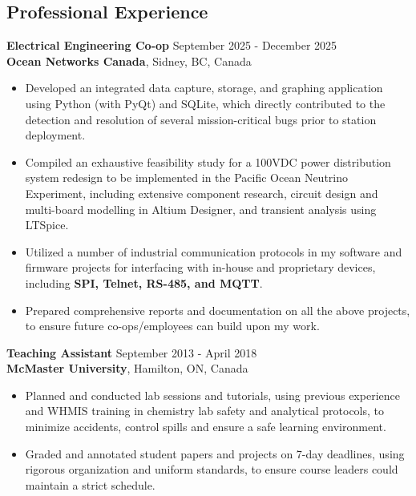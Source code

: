 \documentclass[line,margin]{res}
\begin{document}
\begin{resume}
\section{Professional Experience}
    \textbf{Electrical Engineering Co-op} \hfill September 2025 - December 2025 \\
    \textbf{Ocean Networks Canada}, Sidney, BC, Canada
    \begin{itemize}  \itemsep -2pt
        \item Developed an integrated data capture, storage, and graphing application using Python (with PyQt) and SQLite, which directly contributed to the detection and resolution of several mission-critical bugs prior to station deployment.
        \item Compiled an exhaustive feasibility study for a 100VDC power distribution system redesign to be implemented in the Pacific Ocean Neutrino Experiment, including extensive component research, circuit design and multi-board modelling in Altium Designer, and transient analysis using LTSpice.
        \item Utilized a number of industrial communication protocols in my software and firmware projects for interfacing with in-house and proprietary devices, including \textbf{SPI, Telnet, RS-485, and MQTT}.
        \item Prepared comprehensive reports and documentation on all the above projects, to ensure future co-ops/employees can build upon my work.
    \end{itemize} 
    \textbf{Teaching Assistant} \hfill September 2013 - April 2018 \\
    \textbf{McMaster University}, Hamilton, ON, Canada
    \begin{itemize}  \itemsep -2pt
        \item Planned and conducted lab sessions and tutorials, using previous experience and WHMIS training in chemistry lab safety and analytical protocols, to minimize accidents, control spills and ensure a safe learning environment.
        \item Graded and annotated student papers and projects on 7-day deadlines, using rigorous organization and uniform standards, to ensure course leaders could maintain a strict schedule.
    \end{itemize} 


\end{resume}
\end{document}
